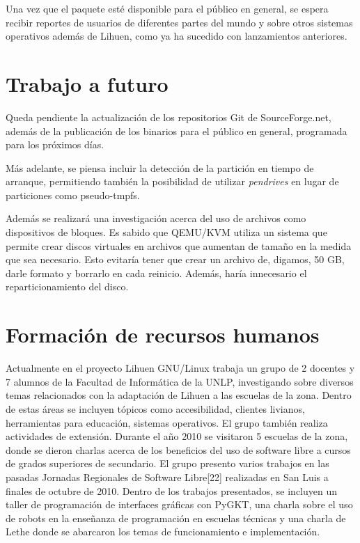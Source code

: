 \documentclass[final,narroweqnarray,inline,twoside]{ieee}
\newcommand{\itref}[1]{[{#1}]}
\begin{document}
Una vez que el paquete esté disponible para el público en general, se espera recibir reportes de usuarios de diferentes
partes del mundo y sobre otros sistemas operativos además de Lihuen, como ya ha sucedido con lanzamientos anteriores.

\section{Trabajo a futuro}
Queda pendiente la actualización de los repositorios Git de SourceForge.net, además de la publicación de los binarios para
el público en general, programada para los próximos días.

Más adelante, se piensa incluir la detección de la partición en tiempo de arranque, permitiendo también la posibilidad de
utilizar \textit{pendrives} en lugar de particiones como pseudo-tmpfs.

Además se realizará una investigación acerca del uso de archivos como dispositivos de bloques. Es sabido que QEMU/KVM utiliza
un sistema que permite crear discos virtuales en archivos que aumentan de tamaño en la medida que sea necesario. Esto
evitaría tener que crear un archivo de, digamos, 50 GB, darle formato y borrarlo en cada reinicio. Además, haría innecesario
el reparticionamiento del disco.

\section{Formación de recursos humanos}
Actualmente en el proyecto Lihuen GNU/Linux trabaja un grupo de 2 docentes y 7 alumnos de la Facultad de Informática de la
UNLP, investigando sobre diversos temas relacionados con la adaptación de Lihuen a las escuelas de la zona. Dentro de estas
áreas se incluyen tópicos como accesibilidad, clientes livianos, herramientas para educación, sistemas operativos. El grupo
también realiza actividades de extensión. Durante el año 2010 se visitaron 5 escuelas de la zona, donde se dieron charlas
acerca de los beneficios del uso de software libre a cursos de grados superiores de secundario. El grupo presento varios
trabajos en las pasadas Jornadas Regionales de Software Libre\itref{22} realizadas en San Luis a finales de octubre de 2010.
Dentro de los trabajos presentados, se incluyen un taller de programación de interfaces gráficas con PyGKT, una charla sobre
el uso de robots en la enseñanza de programación en escuelas técnicas y una charla de Lethe donde se abarcaron los temas de
funcionamiento e implementación.
\end{document}
